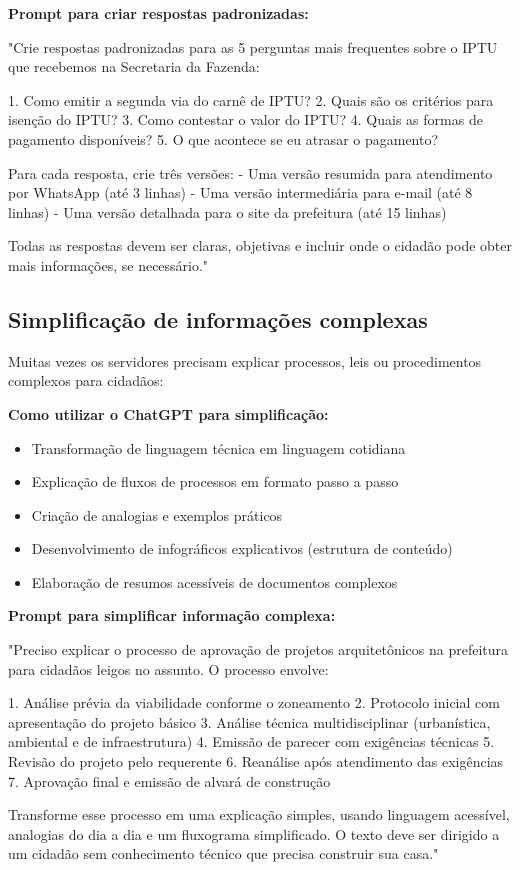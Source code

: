 \documentclass[12pt,a4paper]{book}
\begin{document}
\begin{tcolorbox}[exemplo]
\textbf{Prompt para criar respostas padronizadas:}

"Crie respostas padronizadas para as 5 perguntas mais frequentes sobre o IPTU que recebemos na Secretaria da Fazenda:

1. Como emitir a segunda via do carnê de IPTU?
2. Quais são os critérios para isenção do IPTU?
3. Como contestar o valor do IPTU?
4. Quais as formas de pagamento disponíveis?
5. O que acontece se eu atrasar o pagamento?

Para cada resposta, crie três versões:
- Uma versão resumida para atendimento por WhatsApp (até 3 linhas)
- Uma versão intermediária para e-mail (até 8 linhas)
- Uma versão detalhada para o site da prefeitura (até 15 linhas)

Todas as respostas devem ser claras, objetivas e incluir onde o cidadão pode obter mais informações, se necessário."
\end{tcolorbox}

\subsection{Simplificação de informações complexas}

Muitas vezes os servidores precisam explicar processos, leis ou procedimentos complexos para cidadãos:

\textbf{Como utilizar o ChatGPT para simplificação:}
\begin{itemize}
    \item Transformação de linguagem técnica em linguagem cotidiana
    \item Explicação de fluxos de processos em formato passo a passo
    \item Criação de analogias e exemplos práticos
    \item Desenvolvimento de infográficos explicativos (estrutura de conteúdo)
    \item Elaboração de resumos acessíveis de documentos complexos
\end{itemize}

\begin{tcolorbox}[exemplo]
\textbf{Prompt para simplificar informação complexa:}

"Preciso explicar o processo de aprovação de projetos arquitetônicos na prefeitura para cidadãos leigos no assunto. O processo envolve:

1. Análise prévia da viabilidade conforme o zoneamento
2. Protocolo inicial com apresentação do projeto básico
3. Análise técnica multidisciplinar (urbanística, ambiental e de infraestrutura)
4. Emissão de parecer com exigências técnicas
5. Revisão do projeto pelo requerente
6. Reanálise após atendimento das exigências
7. Aprovação final e emissão de alvará de construção

Transforme esse processo em uma explicação simples, usando linguagem acessível, analogias do dia a dia e um fluxograma simplificado. O texto deve ser dirigido a um cidadão sem conhecimento técnico que precisa construir sua casa."
\end{tcolorbox}
\end{document}
